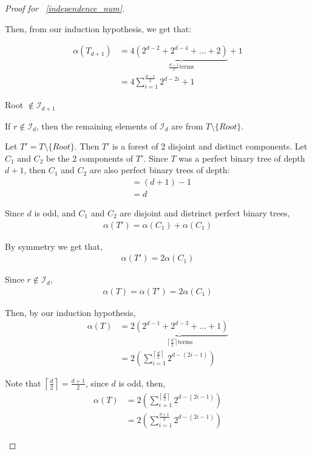 \begin{proof}[Proof for ~\ref{independence_num}]
\begin{caseof}
\begin{subcaseof}
			Then, from our induction hypothesis, we get that:

			\begin{align}
				\alpha(T_{d+1}) & = 4\underbrace{(2^{d - 2} + 2^{d - 4} + \ldots + 2)}_{\frac{d-1}{2} \text{terms}} + 1                           \nonumber \\
						& = 4 \displaystyle\sum_{i = 1}^{\frac{d-1}{2}}2^{d - 2i} + 1 	
			\label{eq:odd_case}
			\end{align}


		\item Root $\not\in \mathcal{I}_{d + 1}$

			If $r \not\in \mathcal{I}_d$, then the remaining elements of $\mathcal{I}_d$ are from $T \setminus \{Root\}$.

			Let $T' = T\setminus\{Root\}$. Then $T'$ is a forest of 2 disjoint and distinct components. Let $C_1$ and $C_2$ be the 2 components of $T'$. Since $T$ was a perfect binary tree of depth $d + 1$, then $C_1$ and $C_2$ are also perfect binary trees of depth:
			\begin{align*}
				 & = (d + 1) - 1 \\
				 & = d
			\end{align*}

			Since $d$ is odd, and $C_1$ and $C_2$ are disjoint and distrinct perfect binary trees,
			\begin{align*}
				\alpha(T') = \alpha(C_1) + \alpha(C_1)
			\end{align*}

			By symmetry we get that,
			\begin{align*}
				\alpha(T') = 2\alpha(C_1)
			\end{align*}

			Since $r \not\in \mathcal{I}_d$,
			\begin{align*}
				\alpha(T) = \alpha(T') = 2\alpha(C_1)
			\end{align*}

			Then, by our induction hypothesis,
			\begin{align}
				\alpha(T) & = \underbrace{2(2^{d - 1} + 2^{d - 3} + \dots + 1)}_{\left\lceil\frac{d}{2}\right\rceil \text{terms}}          \nonumber \\
					  & = 2\left(\displaystyle\sum_{i = 1}^{\left\lceil\frac{d}{2}\right\rceil}2^{d - (2i - 1)}\right) \nonumber
			\end{align}

			Note that $\left\lceil\frac{d}{2}\right\rceil = \frac{d + 1}{2}$, since $d$ is odd, then,
			\begin{align}
				\alpha(T) & = 2\left(\displaystyle\sum_{i = 1}^{\left\lceil\frac{d}{2}\right\rceil}2^{d - (2i - 1)}\right) \nonumber \\
					  & = 2\left(\displaystyle\sum_{i = 1}^{\frac{d + 1}{2}}2^{d - (2i - 1)}\right)  \label{eq:even_case} 
			\end{align}



\end{subcaseof}
\end{caseof}
\end{proof}
